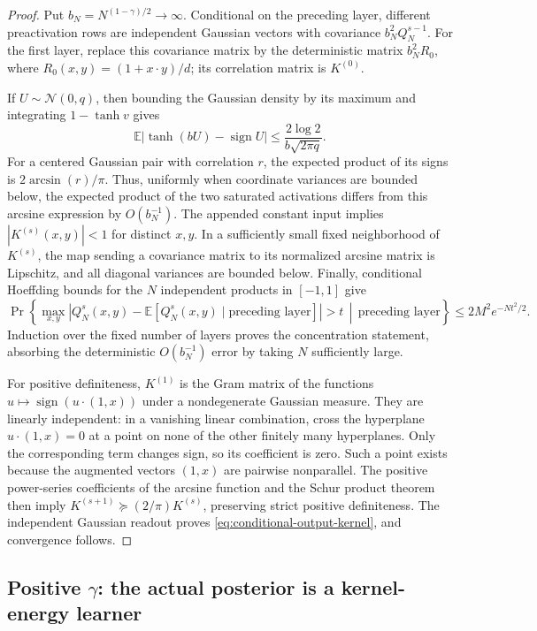 \begin{proof}
Put $b_N=N^{(1-\gamma)/2}\to\infty$. Conditional on the preceding
layer, different preactivation rows are independent Gaussian vectors
with covariance $b_N^2Q_N^{s-1}$. For the first layer, replace this
covariance matrix by the deterministic matrix
$b_N^2R_0$, where $R_0(x,y)=(1+x\cdot y)/d$; its correlation matrix is
$K^{(0)}$.

If $U\sim\mathcal N(0,q)$, then bounding the Gaussian density by its
maximum and integrating $1-\tanh v$ gives
\[
 \mathbb E|\tanh(bU)-\operatorname{sign}U|
 \le \frac{2\log2}{b\sqrt{2\pi q}}.
\]
For a centered Gaussian pair with correlation $r$, the expected product
of its signs is $2\arcsin(r)/\pi$. Thus, uniformly when coordinate
variances are bounded below, the expected product of the two saturated
activations differs from this arcsine expression by $O(b_N^{-1})$.
The appended constant input implies
$|K^{(s)}(x,y)|<1$ for distinct $x,y$. In a sufficiently small fixed
neighborhood of $K^{(s)}$, the map sending a covariance matrix to its
normalized arcsine matrix is Lipschitz, and all diagonal variances are
bounded below. Finally, conditional Hoeffding bounds for the $N$
independent products in $[-1,1]$ give
\[
 \Pr\!\left\{\max_{x,y}|Q_N^s(x,y)
 -\mathbb E[Q_N^s(x,y)\mid\text{preceding layer}]|>t
 \,\middle|\,\text{preceding layer}\right\}
 \le 2M^2 e^{-Nt^2/2}.
\]
Induction over the fixed number of layers proves the concentration
statement, absorbing the deterministic $O(b_N^{-1})$ error by taking
$N$ sufficiently large.

For positive definiteness, $K^{(1)}$ is the Gram matrix of the functions
$u\mapsto\operatorname{sign}(u\cdot(1,x))$ under a nondegenerate
Gaussian measure. They are linearly independent: in a vanishing linear
combination, cross the hyperplane $u\cdot(1,x)=0$ at a point on none of
the other finitely many hyperplanes. Only the corresponding term
changes sign, so its coefficient is zero. Such a point exists because
the augmented vectors $(1,x)$ are pairwise nonparallel. The positive
power-series coefficients of the arcsine function and the Schur product
theorem then imply $K^{(s+1)}\succeq(2/\pi)K^{(s)}$, preserving strict
positive definiteness. The independent Gaussian readout proves
\eqref{eq:conditional-output-kernel}, and convergence follows.
\end{proof}

\subsection{Positive \texorpdfstring{$\gamma$}{gamma}: the actual posterior is a kernel-energy learner}

